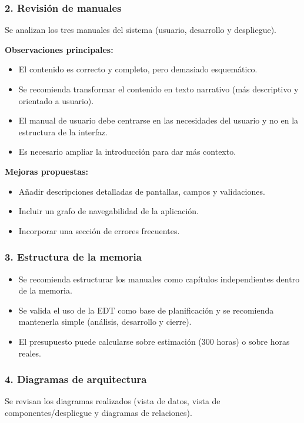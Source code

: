 \subsubsection*{2. Revisión de manuales}
Se analizan los tres manuales del sistema (usuario, desarrollo y despliegue).

\textbf{Observaciones principales:}
\begin{itemize}
    \item El contenido es correcto y completo, pero demasiado esquemático.
    \item Se recomienda transformar el contenido en texto narrativo (más descriptivo y orientado a usuario).
    \item El manual de usuario debe centrarse en las necesidades del usuario y no en la estructura de la interfaz.
    \item Es necesario ampliar la introducción para dar más contexto.
\end{itemize}

\textbf{Mejoras propuestas:}
\begin{itemize}
    \item Añadir descripciones detalladas de pantallas, campos y validaciones.
    \item Incluir un grafo de navegabilidad de la aplicación.
    \item Incorporar una sección de errores frecuentes.
\end{itemize}

\subsubsection*{3. Estructura de la memoria}
\begin{itemize}
    \item Se recomienda estructurar los manuales como capítulos independientes dentro de la memoria.
    \item Se valida el uso de la EDT como base de planificación y se recomienda mantenerla simple (análisis, desarrollo y cierre).
    \item El presupuesto puede calcularse sobre estimación (300 horas) o sobre horas reales.
\end{itemize}

\subsubsection*{4. Diagramas de arquitectura}
Se revisan los diagramas realizados (vista de datos, vista de componentes/despliegue y diagramas de relaciones).


